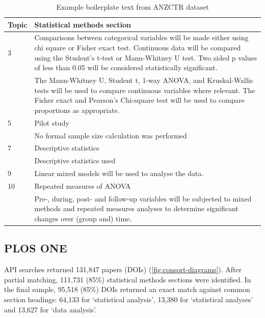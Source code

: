 \documentclass[12pt]{article}
\begin{document}
\begin{landscape}
\begin{table}[]
\centering
\caption{Example boilerplate text from ANZCTR dataset}
\label{tab:anzctr-example-boilerplate}
\begin{tabular}{p{0.1\linewidth} p{0.9\linewidth}}
\hline
\textbf{Topic} & \textbf{Statistical methods section} \\ \hline
3 & Comparisons between categorical variables will be made either using chi square or Fisher exact test. Continuous data will be compared using the Student’s t-test or Mann-Whitney U test. Two sided p values of less than 0.05 will be considered statistically significant.\\
 &  The Mann-Whitney U, Student t, 1-way ANOVA, and Kruskal-Wallis tests will be used to compare continuous variables where relevant. The Fisher exact and Pearson’s Chi-square test will be used to compare proportions as appropriate. \\ \hline
5 & Pilot study \\
 &  No formal sample size calculation was performed \\ \hline
7 & Descriptive statistics \\
 &  Descriptive statistics used \\ \hline
9 & Linear mixed models will be used to analyse the data. \\ \hline
10 & Repeated measures of ANOVA \\
 &  Pre-, during, post- and follow-up variables will be subjected to mixed methods and repeated measures analyses to determine significant changes over (group and) time. \\ \hline
\end{tabular}
\end{table}
\end{landscape}

\subsection{PLOS ONE}\label{plos-one}

API searches returned 131,847 papers (DOIs)
(\autoref{fig:consort-diagrams}). After partial matching, 111,731 (85\%)
statistical methods sections were identified. In the final sample,
95,518 (85\%) DOIs returned an exact match against common section
headings: 64,133 for `statistical analysis', 13,380 for `statistical
analyses' and 13,627 for `data analysis'.
\end{document}

